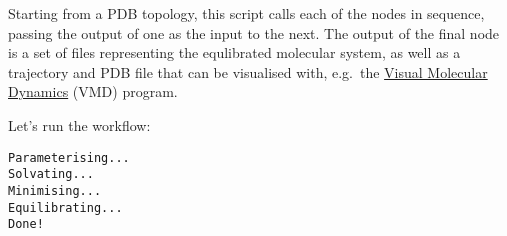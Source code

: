Starting from a PDB topology, this script calls each of the nodes in
sequence, passing the output of one as the input to the next. The output
of the final node is a set of files representing the equlibrated
molecular system, as well as a trajectory and PDB file that can be
visualised with, e.g.~the
\href{https://www.ks.uiuc.edu/Research/vmd/}{Visual Molecular Dynamics}
(VMD) program.

Let's run the workflow:

\begin{Shaded}
\begin{Highlighting}[]
\OperatorTok{/}
\end{Highlighting}
\end{Shaded}

\begin{verbatim}
Parameterising...
Solvating...
Minimising...
Equilibrating...
Done!
\end{verbatim}
